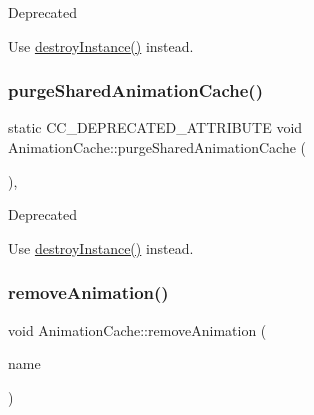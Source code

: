 \begin{DoxyRefDesc}{Deprecated}
\item[\hyperlink{deprecated__deprecated000020}{Deprecated}]Use \hyperlink{classAnimationCache_afb31dcea7d004565aaf1b871e59eec30}{destroy\+Instance()} instead. \end{DoxyRefDesc}
\mbox{\label{classAnimationCache_ad9863fb791f64c88908c5b6e3a8ce745}} 
\subsubsection{\texorpdfstring{purge\+Shared\+Animation\+Cache()}{purgeSharedAnimationCache()}\hspace{0.1cm}{\footnotesize\ttfamily [2/2]}}
{\footnotesize\ttfamily static C\+C\+\_\+\+D\+E\+P\+R\+E\+C\+A\+T\+E\+D\+\_\+\+A\+T\+T\+R\+I\+B\+U\+TE void Animation\+Cache\+::purge\+Shared\+Animation\+Cache (\begin{DoxyParamCaption}{ }\end{DoxyParamCaption})\hspace{0.3cm}{\ttfamily [inline]}, {\ttfamily [static]}}

\begin{DoxyRefDesc}{Deprecated}
\item[\hyperlink{deprecated__deprecated000250}{Deprecated}]Use \hyperlink{classAnimationCache_afb31dcea7d004565aaf1b871e59eec30}{destroy\+Instance()} instead. \end{DoxyRefDesc}
\mbox{\label{classAnimationCache_a7e3f77ac879a17a8418cdb80aebb2ca7}} 
\subsubsection{\texorpdfstring{remove\+Animation()}{removeAnimation()}\hspace{0.1cm}{\footnotesize\ttfamily [1/2]}}
{\footnotesize\ttfamily void Animation\+Cache\+::remove\+Animation (\begin{DoxyParamCaption}\item[{const std\+::string \&}]{name }\end{DoxyParamCaption})}

